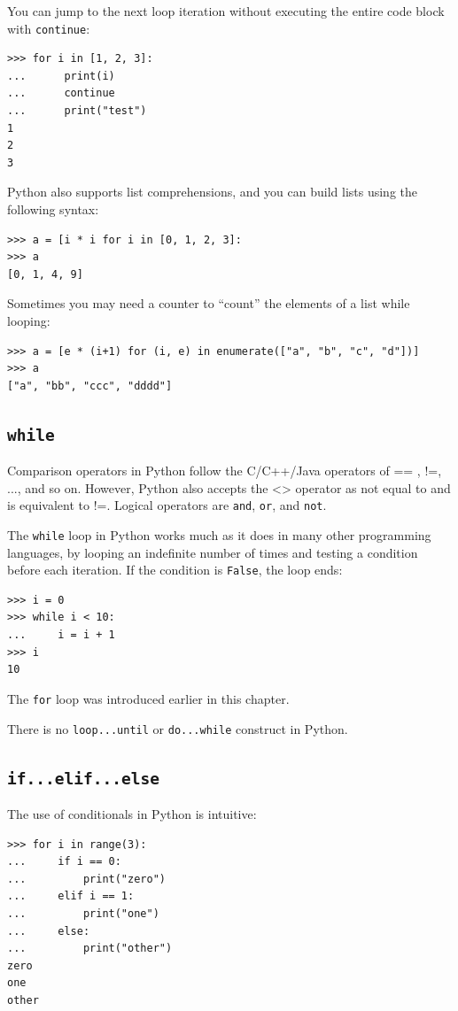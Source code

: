 \documentclass[justified, sixbynine]{tufte-book}
\def\ft{\small\tt}
\theoremstyle{plain}%
\newtheorem * {corollary}{Corollary}
\theoremstyle{definition}
\theoremstyle{remark}
\newtheorem * {remark}{Remark}
\newtheorem * {note}{Note}
\begin{document}
\begin{fullwidth}
You can jump to the next loop iteration without executing the entire code block with {\ft continue}:
\begin{lstlisting}
>>> for i in [1, 2, 3]:
...      print(i)
...      continue
...      print("test")
1
2
3
\end{lstlisting}

Python also supports list comprehensions, and you can build lists using the following syntax:
\begin{lstlisting}
>>> a = [i * i for i in [0, 1, 2, 3]:
>>> a
[0, 1, 4, 9]
\end{lstlisting}

Sometimes you may need a counter to ``count'' the elements of a list while looping:
\begin{lstlisting}
>>> a = [e * (i+1) for (i, e) in enumerate(["a", "b", "c", "d"])]
>>> a
["a", "bb", "ccc", "dddd"]
\end{lstlisting}


\goodbreak\subsection{{\ft while}}

Comparison operators in Python follow the C/C++/Java operators of == , !=, ..., and so on.  However, Python also accepts the <> operator as not equal to and is equivalent to !=.  Logical operators are {\ft and}, {\ft or}, and {\ft not}.

The {\ft while} loop in Python works much as it does in many other programming languages, by looping an indefinite number of times and testing a condition before each iteration. If the condition is {\ft False}, the loop ends:
\begin{lstlisting}
>>> i = 0
>>> while i < 10:
...     i = i + 1
>>> i
10
\end{lstlisting}

The {\ft for} loop was introduced earlier in this chapter.

There is no {\ft loop...until} or {\ft do...while} construct in Python.

\goodbreak\subsection{{\ft if...elif...else}}

  
The use of conditionals in Python is intuitive:
\begin{lstlisting}
>>> for i in range(3):
...     if i == 0:
...         print("zero")
...     elif i == 1:
...         print("one")
...     else:
...         print("other")
zero
one
other
\end{lstlisting}


\end{fullwidth}
\end{document}
